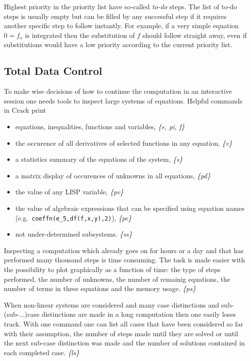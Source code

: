 \documentclass[12pt]{article}
\begin{document}
  Highest priority in the priority list have so-called {\em to-do}
  steps. The list of to-do steps is usually empty but can be filled by
  any successful step if it requires another specific step to follow
  instantly. For example, if a very simple equation $0=f_x$ is
  integrated then the substitution of $f$ should follow straight away, even
  if substitutions would have a low priority according to the 
  current priority list. 

\subsection{Total Data Control}
  To make wise decisions of how to continue
  the computation in an interactive session one needs tools to inspect large systems of
  equations. 
  Helpful commands in {\sc Crack} print
  \begin{itemize}
  \item equations, inequalities, functions and variables, {\em \{e, pi, f\} } 
  \item the occurence of all derivatives of selected functions in any
    equation, {\em \{v\} } 
  \item a statistics summary of the equations of the system, {\em \{s\} } 
  \item a matrix display of occurences of unknowns in all equations, {\em \{pd\} } 
  \item the value of any LISP variable, {\em \{pv\} } 
  \item the value of algebraic expressions that can be specified using
        equation names \\
        (e.g.\ {\tt coeffn(e\_5,df(f,x,y),2)}), {\em \{pe\} } 
  \item not under-determined subsystems. {\em \{ss\} } 
  \end{itemize}

  Inspecting a computation which already goes on for hours or a day and
  that has performed many thousand steps is time consuming. The task is made
  easier with the possibility to plot graphically as a function of
  time: the type of steps performed, the number of unknowns, 
  the number of remainig equations, the number of terms in these
  equations and the memory usage. {\em \{ps\} }
  
  When non-linear systems are considered and many case distinctions
  and sub-(sub-...)case distinctions are made in a long computation
  then one easily loses track. With one command one can
  list all cases that have been considered so far with their assumption, the number
  of steps made until they are solved or until the next sub-case distinction
  was made and the number of solutions contained in each completed
  case. {\em \{ls\} }
\end{document}
